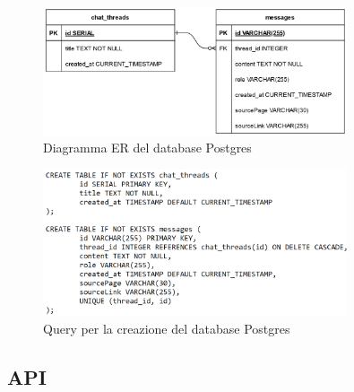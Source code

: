 \begin{figure}[h!]
    \centering  
    \includegraphics[width=0.8\textwidth]{postgresdb.png}
    \caption{Diagramma ER del database Postgres}
\end{figure}
\vspace{2cm}
\begin{figure}[h!]
    \centering  
    \includegraphics[width=0.8\textwidth]{querypostgresdb.png}
    \caption{Query per la creazione del database Postgres}
\end{figure}

\newpage

\subsection{API} \label{subsec:api}



